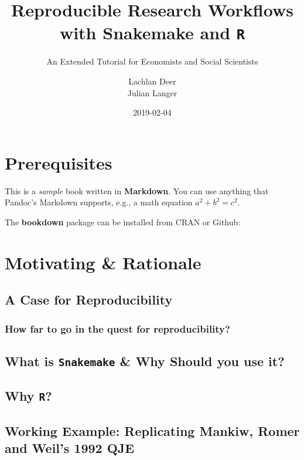 \documentclass[]{book}
\title{Reproducible Research Workflows with Snakemake and \texttt{R}}
\subtitle{An Extended Tutorial for Economists and Social Scientists}
\author{Lachlan Deer \\ Julian Langer}
\date{2019-02-04}
\theoremstyle{definition}
\theoremstyle{definition}
\theoremstyle{definition}
\theoremstyle{remark}
\begin{document}
\maketitle

{
\setcounter{tocdepth}{1}
\tableofcontents
}
\chapter*{Prerequisites}\label{prerequisites}

This is a \emph{sample} book written in \textbf{Markdown}. You can use
anything that Pandoc's Markdown supports, e.g., a math equation
\(a^2 + b^2 = c^2\).

The \textbf{bookdown} package can be installed from CRAN or Github:

\chapter{Motivating \& Rationale}\label{intro}

\section{A Case for Reproducibility}\label{a-case-for-reproducibility}

\subsection{How far to go in the quest for
reproducibility?}\label{how-far-to-go-in-the-quest-for-reproducibility}

\section{\texorpdfstring{What is \texttt{Snakemake} \& Why Should you
use
it?}{What is Snakemake \& Why Should you use it?}}\label{what-is-snakemake-why-should-you-use-it}

\section{\texorpdfstring{Why \texttt{R}?}{Why R?}}\label{why-r}

\section{Working Example: Replicating Mankiw, Romer and Weil's 1992
QJE}\label{working-example-replicating-mankiw-romer-and-weils-1992-qje}
\end{document}
